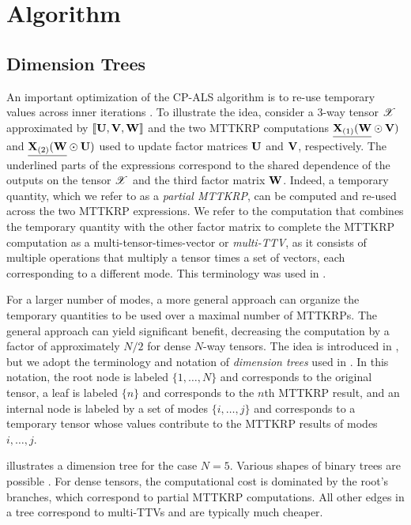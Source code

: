 
\section{Algorithm} 
\label{sec:algorithm}

\subsection{Dimension Trees}
\label{sec:dimtrees}

An important optimization of the CP-ALS algorithm is to re-use temporary values across inner iterations \cite{PTC13a,KU16-TR,LCPSV17,Kaya17}.
To illustrate the idea, consider a 3-way tensor $\T{X}$ approximated by $\dsquare{\M{U},\M{V},\M{W}}$ and the two MTTKRP computations $\underline{\Mz{X}{1}(\M{W}}\Khat\M{V})$ and $\underline{\Mz{X}{2}(\M{W}}\Khat\M{U})$ used to update factor matrices $\M{U}$ and $\M{V}$, respectively.
The underlined parts of the expressions correspond to the shared dependence of the outputs on the tensor $\T{X}$ and the third factor matrix $\M{W}$.
Indeed, a temporary quantity, which we refer to as a \emph{partial MTTKRP}, can be computed and re-used across the two MTTKRP expressions.
We refer to the computation that combines the temporary quantity with the other factor matrix to complete the MTTKRP computation as a multi-tensor-times-vector or \emph{multi-TTV}, as it consists of multiple operations that multiply a tensor times a set of vectors, each corresponding to a different mode.
This terminology was used in \cite{HBJT17-TR}.

For a larger number of modes, a more general approach can organize the temporary quantities to be used over a maximal number of MTTKRPs.
The general approach can yield significant benefit, decreasing the computation by a factor of approximately $N/2$ for dense $N$-way tensors.
The idea is introduced in \cite{PTC13a}, but we adopt the terminology and notation of \emph{dimension trees} used in \cite{KU16-TR,Kaya17}.
In this notation, the root node is labeled $\{1,\dots,N\}$ and corresponds to the original tensor, a leaf is labeled $\{n\}$ and corresponds to the $n$th MTTKRP result, and an internal node is labeled by a set of modes $\{i,\dots,j\}$ and corresponds to a temporary tensor whose values contribute to the MTTKRP results of modes $i,\dots,j$.

 illustrates a dimension tree for the case $N=5$.
Various shapes of binary trees are possible \cite{PTC13a,Kaya17}.
For dense tensors, the computational cost is dominated by the root's branches, which correspond to partial MTTKRP computations.
All other edges in a tree correspond to multi-TTVs and are typically much cheaper.

